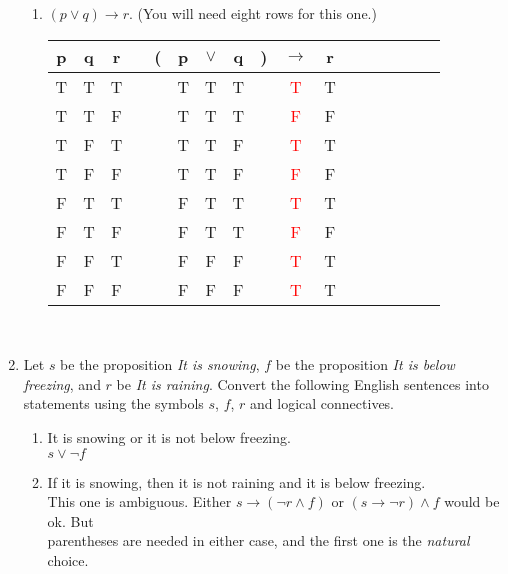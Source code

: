 \documentclass[11pt]{amsart}
\begin{document}
\begin{enumerate}
\begin{enumerate}
\item $(p\lor q)\longrightarrow  r$. 
(You will need eight rows for this one.)\\[10pt]
{\color{blue}
\begin{tabular}{@{ }c@{ }@{ }c@{ }@{ }c | c@{ }@{}c@{}@{ }c@{ }@{ }c@{ }@{ }c@{ }@{}c@{}@{ }c@{ }@{ }c@{ }@{ }c c@{}@{ }cc@{}@{ }c@{ }c}
p & q & r &  & ( & p & $\lor$ & q & ) & $\to$ & r  & \\
\hline
T & T & T &  &  & T & T & T &  & \textcolor{red}{T} & T  &  & \\
T & T & F &  &  & T & T & T &  & \textcolor{red}{F} & F &  &   \\
T & F & T &  &  & T & T & F &  & \textcolor{red}{T} & T &  &   \\
T & F & F &  &  & T & T & F &  & \textcolor{red}{F} & F &  &  \\
F & T & T &  &  & F & T & T &  & \textcolor{red}{T} & T &  &   \\
F & T & F &  &  & F & T & T &  & \textcolor{red}{F} & F &  &   \\
F & F & T &  &  & F & F & F &  & \textcolor{red}{T} & T &  &   \\
F & F & F &  &  & F & F & F &  & \textcolor{red}{T} & T &  &   \\
\end{tabular}\\[5pt]
}

\end{enumerate}


\item Let $s$ be the proposition {\itshape It is snowing}, $f$ be the proposition 
{\itshape It is below freezing}, and $r$ be {\itshape It is raining}. Convert the following English sentences into statements
using the symbols $s$, $f$, $r$ and logical connectives.

\begin{enumerate}

\item It is snowing or it is not below freezing.\\
{\color{blue} $s \lor \lnot f$}\\

\item If it is snowing, then it is not raining and it is below freezing.\\
{\color{blue} This one is ambiguous. 
Either $s \to (\lnot r \land f)$ or $(s \to \lnot r) \land f$ would be ok.
But\\
 parentheses are needed in either case, and the first one is the 
{\itshape natural} choice.}\\[7pt]


\end{enumerate}
\end{enumerate}
\end{document}
